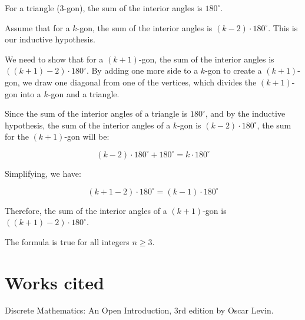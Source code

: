 \documentclass{article}
\begin{document}
For a triangle (3-gon), the sum of the interior angles is \(180^\circ\).


Assume that for a \(k\)-gon, the sum of the interior angles is \((k - 2) \cdot 180^\circ\). This is our inductive hypothesis.


We need to show that for a \((k + 1)\)-gon, the sum of the interior angles is \(((k + 1) - 2) \cdot 180^\circ\). By adding one more side to a \(k\)-gon to create a \((k + 1)\)-gon, we draw one diagonal from one of the vertices, which divides the \((k + 1)\)-gon into a \(k\)-gon and a triangle.

Since the sum of the interior angles of a triangle is \(180^\circ\), and by the inductive hypothesis, the sum of the interior angles of a \(k\)-gon is \((k - 2) \cdot 180^\circ\), the sum for the \((k + 1)\)-gon will be:

\[(k - 2) \cdot 180^\circ + 180^\circ = k \cdot 180^\circ\]

Simplifying, we have:

\[(k + 1 - 2) \cdot 180^\circ = (k - 1) \cdot 180^\circ\]

Therefore, the sum of the interior angles of a \((k + 1)\)-gon is \(((k + 1) - 2) \cdot 180^\circ\).

The formula is true for all integers \(n \geq 3\).

\section*{Works cited}
Discrete Mathematics: An Open Introduction, 3rd edition by Oscar Levin.
\end{document}

